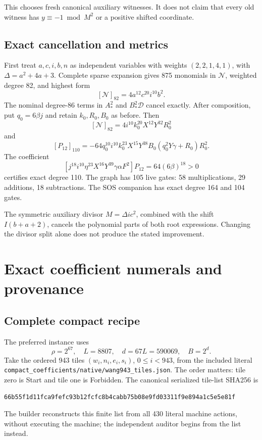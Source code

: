 \documentclass[11pt,a4paper]{article}
\theoremstyle{definition}
\newcommand{\qzero}{q_{\!0}}
\newcommand{\kzero}{k_{\!0}}
\newcommand{\Rzero}{R_{\!0}}
\newcommand{\Bzero}{B_{\!0}}
\newcommand{\indeg}[2]{[#1]_{#2}}
\newcommand{\src}[1]{{\urlstyle{tt}\nolinkurl{#1}}}
\begin{document}
This chooses fresh canonical auxiliary witnesses. It does not
claim that every old witness has \(y\equiv-1\bmod M^2\) or a
positive shifted coordinate.

\subsection{Exact cancellation and metrics}

First treat \(a,c,i,b,n\) as independent variables with weights
\((2,2,1,4,1)\), with \(\Delta=a^2+4a+3\).
Complete sparse expansion gives 875 monomials in \(\mathcal N\),
weighted degree 82, and highest form
\[
 \indeg{\mathcal N}{82}=4a^{12}c^{20}i^{10}b^2.
\]
The nominal degree-86 terms in \(A_*^2\) and
\(B_*^2\mathcal D\) cancel exactly.
After composition, put \(\qzero=6\beta j\) and retain
\(\kzero,\Rzero,\Bzero\) as before. Then
\[
 \indeg{\mathcal N}{82}
    =4i^{10}\kzero^{20}X^{12}Y^{32}\Rzero^2
\]
and
\[
 \indeg{P_{12}}{110}
   =-64\qzero^{10}i^{10}\kzero^{23}X^{15}Y^{38}\Bzero
              (\qzero^2Y\gamma+\Rzero)\Rzero^2.
\]
The coefficient
\[
 [j^{18}i^{10}\eta^{23}X^{16}Y^{39}\gamma\alpha F^2]P_{12}
       =64(6\beta)^{18}>0
\]
certifies exact degree 110. The graph has 105 live gates:
58 multiplications, 29 additions, 18 subtractions.
The SOS companion has exact degree 164 and 104 gates.

The symmetric auxiliary divisor \(M=\Delta ic^2\), combined
with the shift \(I(b+a+2)\), cancels the polynomial parts of
both root expressions. Changing the divisor split alone does
not produce the stated improvement.

\section{Exact coefficient numerals and provenance}
\label{sec:coefficients}

\subsection{Complete compact recipe}

The preferred instance uses
\[
 \rho=2^{67},\quad L=8807,\quad d=67L=590069,\quad B=2^d.
\]
Take the ordered 943 tiles
\((w_i,n_i,e_i,s_i)\), \(0\le i<943\), from the included
literal \src{compact_coefficients/native/wang943_tiles.json}.
The order matters: tile zero is Start and tile one is Forbidden.
The canonical serialized tile-list SHA256 is
\begin{lstlisting}
66b55f1d11fca9fefc93b12fcfc8b4cabb75b08e9fd03311f9e894a1c5e5e81f
\end{lstlisting}
The builder reconstructs this finite list from all 430 literal
machine actions, without executing the machine; the independent
auditor begins from the list instead.
\end{document}
